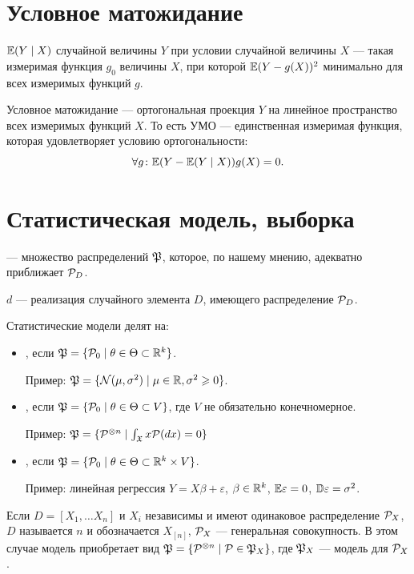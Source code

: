 \documentclass[11pt]{book}
\begin{document}
\section{Условное матожидание}
\begin{definition}[]
	 $\E (Y \mid X)$ случайной величины $Y$ при условии случайной величины $X$ --- такая измеримая функция $g_0$ величины $X$, при которой $\E(Y - g(X))^2$ минимально для всех измеримых функций $g$.
\end{definition}
Условное матожидание --- ортогональная проекция $Y$ на линейное пространство всех измеримых функций $X$. То есть УМО --- единственная измеримая функция, которая удовлетворяет условию ортогональности:
 \[
\forall g \colon\E(Y - \E(Y \mid X)) g(X) = 0
.\] 

\section{Статистическая модель, выборка}
\begin{definition}[]
	 --- множество распределений $\PP$, которое, по нашему мнению, адекватно приближает $\P_D$. 
\end{definition}
\begin{definition}[]
	 $d$ --- реализация случайного элемента $D$, имеющего распределение $\P_D$.
\end{definition}
Статистические модели делят на:
\begin{itemize}
	\item {}, если $\PP = \{\P_0 \mid \theta \in \Theta \subset \R^{k}\}$.

		Пример: $\PP = \{\N(\mu, \sigma^2) \mid \mu \in \R, \sigma^2 \ge 0\}$.
	\item {}, если $\PP = \{\P_0 \mid \theta \in  \Theta \subset V\}$, где $V$ не обязательно конечномерное.

		Пример: $\PP = \{\P^{\otimes n} \mid \int_{\mathfrak{X}}^{} x \P(dx) = 0 \}$
	\item {}, если $\PP = \{\P_0 \mid \theta \in \Theta \subset \R^{k} \times V\}$.

		Пример: линейная регрессия $Y = X \beta + \varepsilon$, $\beta \in \R^{k}$, $\E \varepsilon = 0$, $\D \varepsilon = \sigma^2$.
\end{itemize}
Если $D = [X_1, \ldots X_n]$ и $X_i$ независимы и имеют одинаковое распределение $\P_{X}$, $D$ называется  $n$ и обозначается $X_{[n]}$, $\P_{X}$ --- генеральная совокупность.
В этом случае модель приобретает вид
$ \PP = \{\P^{\otimes n} \mid \P \in \PP_X\} $, где $\PP_X$ --- модель для $\P_X$.
\end{document}
